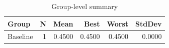 \begin{table}[htbp]
\centering
\caption{Group-level summary}
\label{tab:group-summary}
\begin{tabular}{lrrrrr}
\toprule
\textbf{Group} & \textbf{N} & \textbf{Mean} & \textbf{Best} & \textbf{Worst} & \textbf{StdDev} \\
\midrule
Baseline & 1 & 0.4500 & 0.4500 & 0.4500 & 0.0000 \\
\bottomrule
\end{tabular}
\end{table}